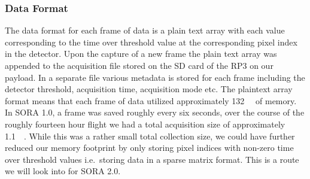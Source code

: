 {\subsubsection{Data Format}
The data format for each frame of data is a plain text array with each value corresponding to the time over threshold value at the corresponding pixel index in the detector. Upon the capture of a new frame the plain text array was appended to the acquisition file stored on the SD card of the RP\num{3} on our payload. In a separate file various metadata is stored for each frame including the detector threshold, acquisition time, acquisition mode etc. The plaintext array format means that each frame of data utilized approximately \SI{132}{\kilo\byte} of memory. In SORA \num{1.0}, a frame was saved roughly every six seconds, over the course of the roughly fourteen hour flight we had a total acquisition size of approximately \SI{1.1}{\giga\byte}. While this was a rather small total collection size, we could have further reduced our memory footprint by only storing pixel indices with non-zero time over threshold values i.e.\ storing data in a sparse matrix format. This is a route we will look into for SORA \num{2.0}.

}
